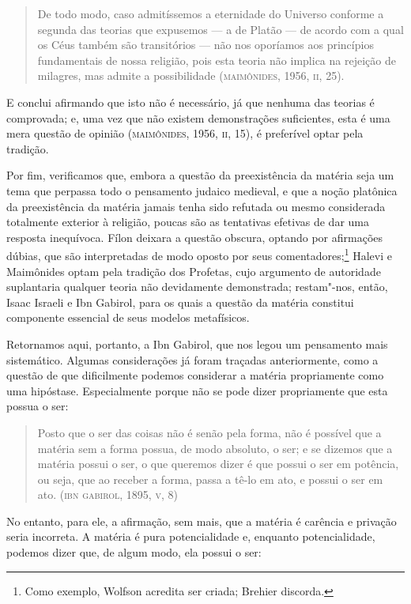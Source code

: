 \begin{quote}
De todo modo, caso admitíssemos a eternidade do Universo conforme a
segunda das teorias que expusemos --- a de Platão --- de acordo com a
qual os Céus também são transitórios --- não nos oporíamos aos
princípios fundamentais de nossa religião, pois esta teoria não
implica na rejeição de milagres, mas admite a possibilidade
(\textsc{maimônides}, 1956, \textsc{ii}, 25). 
\end{quote}

E conclui afirmando que isto não é necessário, já que nenhuma das
teorias é comprovada; e, uma vez que não existem demonstrações
suficientes, esta é uma mera questão de opinião (\textsc{maimônides}, 1956,
\textsc{ii}, 15), é preferível optar pela tradição.

Por fim, verificamos que, embora a questão da preexistência da
matéria
seja um tema que perpassa todo o pensamento judaico medieval, e que
a
noção platônica da preexistência da matéria jamais tenha sido
refutada ou mesmo considerada totalmente exterior à religião, poucas
são as tentativas efetivas de dar uma resposta inequívoca. Fílon
deixara a questão obscura, optando por afirmações dúbias, que são
interpretadas de modo oposto por seus comentadores;\footnote{ Como
exemplo, Wolfson acredita ser criada; Brehier
discorda.} Halevi e Maimônides optam pela tradição dos Profetas,
cujo argumento de autoridade suplantaria qualquer teoria não
devidamente demonstrada; restam"-nos, então, Isaac Israeli e Ibn
Gabirol, para os quais a questão da matéria constitui componente
essencial de seus modelos metafísicos. 

Retornamos aqui, portanto, a Ibn Gabirol, que nos legou um
pensamento
mais sistemático. Algumas considerações já foram traçadas
anteriormente, como a questão de que dificilmente podemos considerar
a matéria propriamente como uma hipóstase. Especialmente porque não
se pode dizer propriamente que esta possua o ser:

\begin{quote}
Posto que o ser das coisas não é senão pela forma, não é possível que a matéria
sem a forma possua, de modo absoluto, o ser; e se dizemos que a matéria possui o
ser, o que queremos dizer é que possui o ser em potência, ou seja, que ao
receber a forma, passa a tê-lo em ato, e possui o ser em ato. (\textsc{ibn}
\textsc{gabirol}, 1895, \textsc{v}, 8)
\end{quote}

No entanto, para ele, a afirmação, sem mais, que a matéria é
carência
e privação seria incorreta. A matéria é pura potencialidade e,
enquanto potencialidade, podemos dizer que, de algum modo, ela
possui
o ser:


